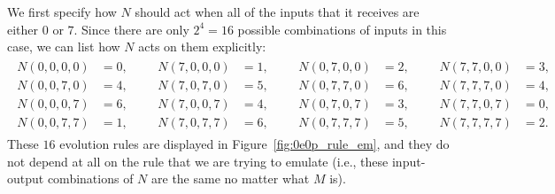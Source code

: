 We first specify how $N$ should act when all of the inputs that it receives are either $0$ or $7$. Since there are only $2^4 = 16$ possible combinations of inputs in this case, we can list how $N$ acts on them explicitly:
\begin{align}\label{eq:0e0p_N_from_even}
	\begin{aligned}
		N(0,0,0,0) & = 0, \\ N(0,0,7,0) & = 4, \\ N(0,0,0,7) & = 6, \\ N(0,0,7,7) & = 1,
	\end{aligned} && \begin{aligned}
		N(7,0,0,0) & = 1, \\ N(7,0,7,0) & = 5, \\ N(7,0,0,7) & = 4, \\ N(7,0,7,7) & = 6,
	\end{aligned} && \begin{aligned}
		N(0,7,0,0) & = 2, \\ N(0,7,7,0) & = 6, \\ N(0,7,0,7) & = 3, \\ N(0,7,7,7) & = 5,
	\end{aligned} && \begin{aligned}
		N(7,7,0,0) & = 3, \\ N(7,7,7,0) & = 4, \\ N(7,7,0,7) & = 0, \\ N(7,7,7,7) & = 2.
	\end{aligned}
\end{align}
These $16$ evolution rules are displayed in Figure~\ref{fig:0e0p_rule_em}, and they do not depend at all on the rule that we are trying to emulate (i.e., these input-output combinations of $N$ are the same no matter what $M$ is).

